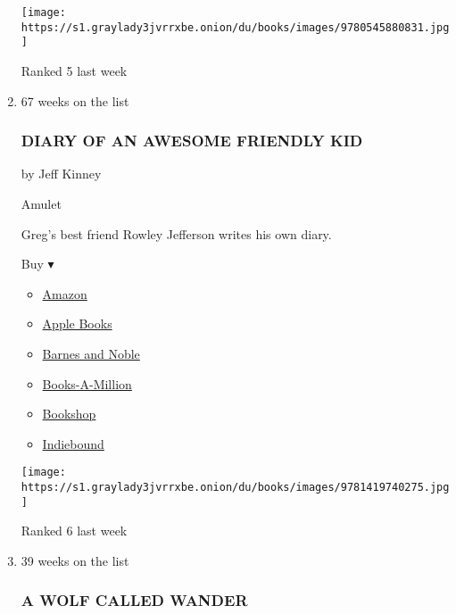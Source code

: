 \begin{enumerate}
  \texttt{[image: https://s1.graylady3jvrrxbe.onion/du/books/images/9780545880831.jpg]}

  Ranked 5 last week
\item
  67 weeks on the list

  \hypertarget{diary-of-an-awesome-friendly-kid}{%
  \subsubsection{DIARY OF AN AWESOME FRIENDLY
  KID}\label{diary-of-an-awesome-friendly-kid}}

  by Jeff Kinney

  Amulet

  Greg's best friend Rowley Jefferson writes his own diary.

  Buy ▾

  \begin{itemize}
  \tightlist
  \item
    \href{https://www.amazon.com/Diary-Awesome-Friendly-Jeff-Kinney/dp/141974027X?tag=NYTBS-20}{Amazon}
  \item
    \href{https://du-gae-books-dot-nyt-du-prd.appspot.com/buy?title=DIARY+OF+AN+AWESOME+FRIENDLY+KID\&author=Jeff+Kinney}{Apple
    Books}
  \item
    \href{https://www.anrdoezrs.net/click-7990613-11819508?url=https\%3A\%2F\%2Fwww.barnesandnoble.com\%2Fw\%2F\%3Fean\%3D9781419740275}{Barnes
    and Noble}
  \item
    \href{https://www.anrdoezrs.net/click-7990613-35140?url=https\%3A\%2F\%2Fwww.booksamillion.com\%2Fp\%2FDIARY\%2BOF\%2BAN\%2BAWESOME\%2BFRIENDLY\%2BKID\%2FJeff\%2BKinney\%2F9781419740275}{Books-A-Million}
  \item
    \href{https://bookshop.org/a/3546/9781419740275}{Bookshop}
  \item
    \href{https://www.indiebound.org/book/9781419740275?aff=NYT}{Indiebound}
  \end{itemize}

  \texttt{[image: https://s1.graylady3jvrrxbe.onion/du/books/images/9781419740275.jpg]}

  Ranked 6 last week
\item
  39 weeks on the list

  \hypertarget{a-wolf-called-wander}{%
  \subsubsection{A WOLF CALLED WANDER}\label{a-wolf-called-wander}}


\end{enumerate}
